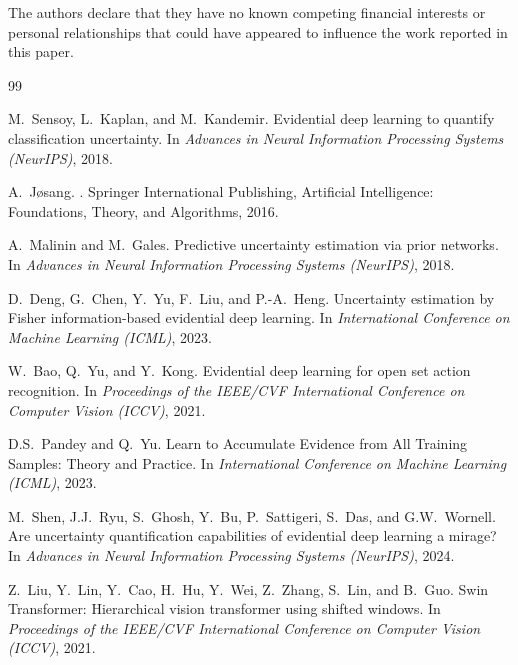 \documentclass[letterpaper]{article} %
\begin{document}
The authors declare that they have no known competing financial interests or personal relationships that could have appeared to influence the work reported in this paper.

\begin{thebibliography}{99}


M.~Sensoy, L.~Kaplan, and M.~Kandemir.
\newblock Evidential deep learning to quantify classification uncertainty.
\newblock In {\em Advances in Neural Information Processing Systems (NeurIPS)}, 2018.

A.~J{\o}sang.
.
\newblock Springer International Publishing, Artificial Intelligence: Foundations, Theory, and Algorithms, 2016.

A.~Malinin and M.~Gales.
\newblock Predictive uncertainty estimation via prior networks.
\newblock In {\em Advances in Neural Information Processing Systems (NeurIPS)}, 2018.

D.~Deng, G.~Chen, Y.~Yu, F.~Liu, and P.-A.~Heng.
\newblock Uncertainty estimation by Fisher information-based evidential deep learning.
\newblock In {\em International Conference on Machine Learning (ICML)}, 2023.

W.~Bao, Q.~Yu, and Y.~Kong.
\newblock Evidential deep learning for open set action recognition.
\newblock In {\em Proceedings of the IEEE/CVF International Conference on Computer Vision (ICCV)}, 2021.

D.S.~Pandey and Q.~Yu.
\newblock Learn to Accumulate Evidence from All Training Samples: Theory and Practice.
\newblock In {\em International Conference on Machine Learning (ICML)}, 2023.

M.~Shen, J.J.~Ryu, S.~Ghosh, Y.~Bu, P.~Sattigeri, S.~Das, and G.W.~Wornell.
\newblock Are uncertainty quantification capabilities of evidential deep learning a mirage?
\newblock In {\em Advances in Neural Information Processing Systems (NeurIPS)}, 2024.


Z.~Liu, Y.~Lin, Y.~Cao, H.~Hu, Y.~Wei, Z.~Zhang, S.~Lin, and B.~Guo.
\newblock Swin Transformer: Hierarchical vision transformer using shifted windows.
\newblock In {\em Proceedings of the IEEE/CVF International Conference on Computer Vision (ICCV)}, 2021.


\end{thebibliography}
\end{document}

